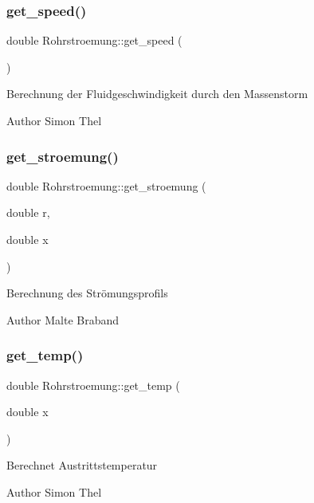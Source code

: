\subsubsection{\texorpdfstring{get\+\_\+speed()}{get\_speed()}}
{\footnotesize\ttfamily double Rohrstroemung\+::get\+\_\+speed (\begin{DoxyParamCaption}{ }\end{DoxyParamCaption})}

Berechnung der Fluidgeschwindigkeit durch den Massenstorm \begin{DoxyAuthor}{Author}
Simon Thel 
\end{DoxyAuthor}
\mbox{\label{class_rohrstroemung_a1eae88254e88fbb314096c795ec2fac2}} 
\subsubsection{\texorpdfstring{get\+\_\+stroemung()}{get\_stroemung()}}
{\footnotesize\ttfamily double Rohrstroemung\+::get\+\_\+stroemung (\begin{DoxyParamCaption}\item[{double}]{r,  }\item[{double}]{x }\end{DoxyParamCaption})}

Berechnung des Strömungsprofils \begin{DoxyAuthor}{Author}
Malte Braband 
\end{DoxyAuthor}
\mbox{\label{class_rohrstroemung_adc94a5748b40f9e47448a11e55809593}} 
\subsubsection{\texorpdfstring{get\+\_\+temp()}{get\_temp()}\hspace{0.1cm}{\footnotesize\ttfamily [1/2]}}
{\footnotesize\ttfamily double Rohrstroemung\+::get\+\_\+temp (\begin{DoxyParamCaption}\item[{double}]{x }\end{DoxyParamCaption})}

Berechnet Austrittstemperatur \begin{DoxyAuthor}{Author}
Simon Thel 
\end{DoxyAuthor}
\mbox{\label{class_rohrstroemung_a46d4e8bb41a8204b96fe0420087e69ec}} 
